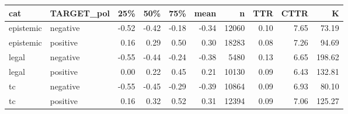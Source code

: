 \begin{table}[ht]
\centering
\begin{tabular}{llrrrrrrrr}
  \hline
cat & TARGET\_pol & 25\% & 50\% & 75\% & mean & n & TTR & CTTR & K \\ 
  \hline
epistemic & negative & -0.52 & -0.42 & -0.18 & -0.34 & 12060 & 0.10 & 7.65 & 73.19 \\ 
  epistemic & positive & 0.16 & 0.29 & 0.50 & 0.30 & 18283 & 0.08 & 7.26 & 94.69 \\ 
  legal & negative & -0.55 & -0.44 & -0.24 & -0.38 & 5480 & 0.13 & 6.65 & 198.62 \\ 
  legal & positive & 0.00 & 0.22 & 0.45 & 0.21 & 10130 & 0.09 & 6.43 & 132.81 \\ 
  tc & negative & -0.55 & -0.45 & -0.29 & -0.39 & 10864 & 0.09 & 6.93 & 80.10 \\ 
  tc & positive & 0.16 & 0.32 & 0.52 & 0.31 & 12394 & 0.09 & 7.06 & 125.27 \\ 
   \hline
\end{tabular}
\end{table}

